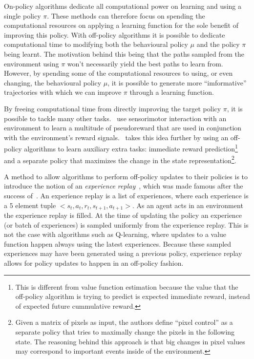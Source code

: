\documentclass{../main.tex}{}
\begin{document}
On-policy algorithms dedicate all computational power on learning and using a single policy $\pi$. These methods can therefore focus on spending the computational resources on applying a learning function for the sole benefit of improving this policy. With off-policy algorithms it is possible to dedicate computational time to modifying both the behavioural policy $\mu$ and the policy $\pi$ being learnt. The motivation behind this being that the paths sampled from the environment using $\pi$ won't necessarily yield the best paths to learn from. However, by spending some of the computational resources to using, or even changing, the behavioural policy $\mu$, it is possible to generate more ``imformative'' trajectories with which we can improve $\pi$ through a learning function.

By freeing computational time from directly improving the target policy $\pi$, it is possible to tackle many other tasks.~\cite{Sutton2010} use sensorimotor interaction with an environment to learn a multitude of pseudoreward that are used in conjunction with the environment's reward signals.~\cite{Jaderberg2016} takes this idea further by using an off-policy algorithms to learn auxiliary extra tasks: immediate reward prediction\footnote{This is different from value function estimation because the value that the off-policy algorithm is trying to predict is expected immediate reward, instead of expected future cummulative reward.} and a separate policy that maximizes the change in the state representation\footnote{Given a matrix of pixels as input, the authors define ``pixel control'' as a separate policy that tries to maximally change the pixels in the following state. The reasoning behind this approach is that big changes in pixel values may correspond to important events inside of the environment.}.

A method to allow algorithms to perform off-policy updates to their policies is to introduce the notion of an \textit{experience replay}~\citep{Lin1993}, which was made famous after the success of~\cite{Mnih2013}. An experience replay is a list of experiences, where each experience is a 5 element tuple $<s_t, a_t, r_t, s_{t+1}, a_{t+1}>$. As an agent acts in an environment the experience replay is filled. At the time of updating the policy an experience (or batch of experiences) is sampled uniformly from the experience replay. This is not the case with algorithms such as Q-learning, where updates to a value function happen always using the latest experiences. Because these sampled experiences may have been generated using a previous policy, experience replay allows for policy updates to happen in an off-policy fashion. 
\end{document}

